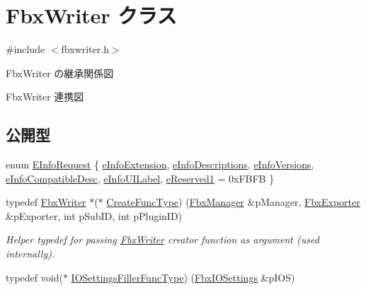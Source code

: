 \hypertarget{class_fbx_writer}{}\section{Fbx\+Writer クラス}
\label{class_fbx_writer}


{\ttfamily \#include $<$fbxwriter.\+h$>$}



Fbx\+Writer の継承関係図


Fbx\+Writer 連携図
\subsection*{公開型}
\begin{DoxyCompactItemize}
\item 
enum \hyperlink{class_fbx_writer_a250cda8a59afd8e6be01c89cdd914e2a}{E\+Info\+Request} \{ \newline
\hyperlink{class_fbx_writer_a250cda8a59afd8e6be01c89cdd914e2aa685ae092e9d1dd70ee474474e6709ef1}{e\+Info\+Extension}, 
\hyperlink{class_fbx_writer_a250cda8a59afd8e6be01c89cdd914e2aaa784d31d1a1b64f8806e2bf08a7357ad}{e\+Info\+Descriptions}, 
\hyperlink{class_fbx_writer_a250cda8a59afd8e6be01c89cdd914e2aa5f280243592cee085c8955019a55e3a0}{e\+Info\+Versions}, 
\hyperlink{class_fbx_writer_a250cda8a59afd8e6be01c89cdd914e2aa91a4948dc9ea8e95d12c6b11800b8b4c}{e\+Info\+Compatible\+Desc}, 
\newline
\hyperlink{class_fbx_writer_a250cda8a59afd8e6be01c89cdd914e2aad8a61c4aecfefa09584a0aa66a31b4ba}{e\+Info\+U\+I\+Label}, 
\hyperlink{class_fbx_writer_a250cda8a59afd8e6be01c89cdd914e2aadb4e4b68e6bb39c4f0ada4b3088ad4f7}{e\+Reserved1} = 0x\+F\+B\+FB
 \}
\item 
typedef \hyperlink{class_fbx_writer}{Fbx\+Writer} $\ast$($\ast$ \hyperlink{class_fbx_writer_aa634a7d29a01f8197f814437644e845b}{Create\+Func\+Type}) (\hyperlink{class_fbx_manager}{Fbx\+Manager} \&p\+Manager, \hyperlink{class_fbx_exporter}{Fbx\+Exporter} \&p\+Exporter, int p\+Sub\+ID, int p\+Plugin\+ID)
\begin{DoxyCompactList}\small\item\em Helper typedef for passing \hyperlink{class_fbx_writer}{Fbx\+Writer} creator function as argument (used internally). \end{DoxyCompactList}\item 
typedef void($\ast$ \hyperlink{class_fbx_writer_a43eb86f1aae1a6a424c54bcf294553c5}{I\+O\+Settings\+Filler\+Func\+Type}) (\hyperlink{class_fbx_i_o_settings}{Fbx\+I\+O\+Settings} \&p\+I\+OS)

\end{DoxyCompactItemize}
